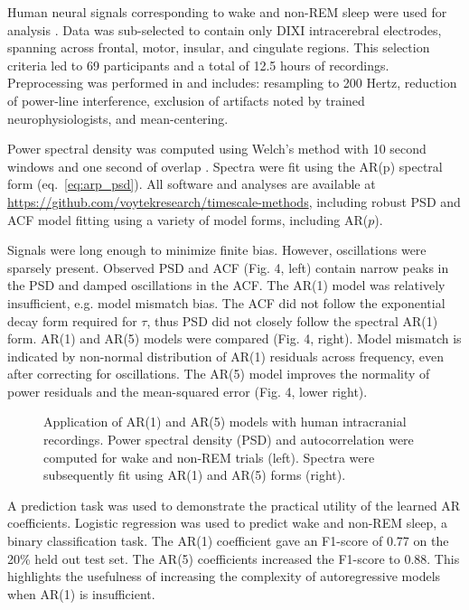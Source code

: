 \documentclass[pdflatex,sn-mathphys-num]{sn-jnl}
\begin{document}
Human neural signals corresponding to wake and non-REM sleep were used for analysis \cite{frauscher_atlas_2018, frauscher_highfrequency_2018, von_ellenrieder_how_2020}. Data was sub-selected to contain only DIXI intracerebral electrodes, spanning across frontal, motor, insular, and cingulate regions. This selection criteria led to 69 participants and a total of 12.5 hours of recordings. Preprocessing was performed in \cite{frauscher_atlas_2018, frauscher_highfrequency_2018, von_ellenrieder_how_2020} and includes: resampling to 200 Hertz, reduction of power-line interference, exclusion of artifacts noted by trained neurophysiologists, and mean-centering.

Power spectral density was computed using Welch’s method with 10 second windows and one second of overlap \cite{cole_neurodsp_2019}. Spectra were fit using the AR(p) spectral form (eq.~\ref{eq:arp_psd}). All software and analyses are available at \href{https://github.com/voytekresearch/timescale-methods}{https://github.com/voytekresearch/timescale-methods}, including robust PSD and ACF model fitting using a variety of model forms, including AR($p$).

Signals were long enough to minimize finite bias. However, oscillations were sparsely present. Observed PSD and ACF (Fig. 4, left) contain narrow peaks in the PSD and damped oscillations in the ACF.  The AR(1) model was relatively insufficient, e.g. model mismatch bias. The ACF did not follow the exponential decay form required for $\tau$, thus PSD did not closely follow the spectral AR(1) form. AR(1) and AR(5) models were compared (Fig. 4, right). Model mismatch is indicated by non-normal distribution of AR(1) residuals across frequency, even after correcting for oscillations. The AR(5) model improves the normality of power residuals and the mean-squared error (Fig. 4, lower right).

\begin{figure}[htbp]
    \centering
    
    \caption{Application of AR(1) and AR(5) models with human intracranial recordings. Power spectral density (PSD) and autocorrelation were computed for wake and non-REM trials (left). Spectra were subsequently fit using AR(1) and AR(5) forms (right).}
    \label{fig:application}
\end{figure}

A prediction task was used to demonstrate the practical utility of the learned AR coefficients. Logistic regression was used to predict wake and non-REM sleep, a binary classification task. The AR(1) coefficient gave an F1-score of 0.77 on the 20\% held out test set. The AR(5) coefficients increased the F1-score to 0.88. This highlights the usefulness of increasing the complexity of autoregressive models when AR(1) is insufficient.


\end{document}
